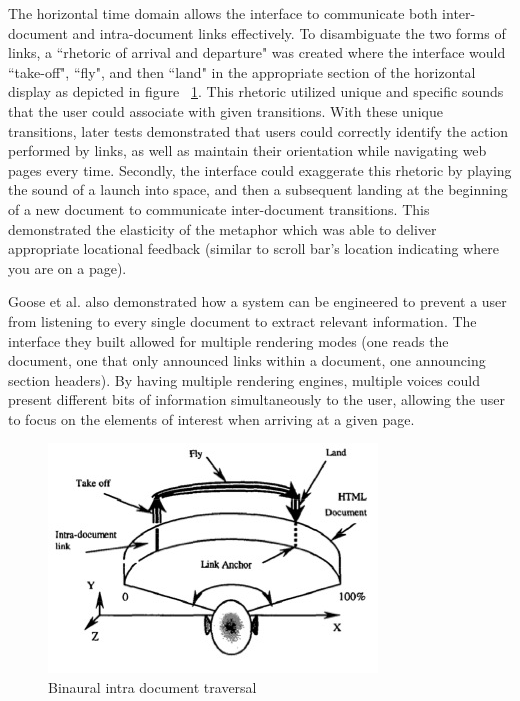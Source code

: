 The horizontal time domain allows the interface to communicate both inter-document
and intra-document links effectively.  To disambiguate the two forms of links,
a ``rhetoric of arrival and departure" was created where the interface would
``take-off", ``fly", and then ``land" in the appropriate section of the horizontal
display as depicted in figure ~\ref{fig:goose_intra}. This rhetoric utilized
unique and specific sounds that the user could associate with given transitions.
With these unique transitions, later tests demonstrated that users could
correctly identify the action performed by links, as well as maintain their
orientation while navigating web pages every time.  Secondly, the interface
could exaggerate this rhetoric by playing the sound of a launch into space,
and then a subsequent landing at the beginning of a new document to
communicate inter-document transitions. This demonstrated the elasticity of
the metaphor which was able to deliver appropriate locational feedback
(similar to scroll bar's location indicating where you are on a page).

Goose et al. also demonstrated how a system can be engineered to prevent a
user from listening to every single document to extract relevant information.
The interface they built allowed for multiple rendering modes (one reads the
document, one that only announced links within a document,  one announcing
section headers).  By having multiple rendering engines, multiple voices
could present different bits of information simultaneously to the user,
allowing the user to focus on the elements of interest when arriving at a
given page.

\begin{figure}[t]
    \centering
    \includegraphics[width=.7\linewidth]{images/goose_intra.jpg}
    \caption{Binaural intra document traversal}
    \label{fig:goose_intra}
\end{figure}

